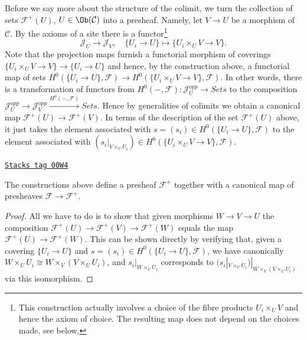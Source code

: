 \medskip\noindent
Before we say more about the structure of the colimit, we turn
the collection of sets
$\mathcal{F}^{+}(U)$, $U \in \Ob(\mathcal{C})$
into a presheaf. Namely, let $V \to U$ be a morphism of $\mathcal{C}$.
By the axioms of a site there is a functor\footnote{This construction
actually involves a choice of the fibre products $U_i \times_U V$
and hence the axiom of choice. The resulting map does not depend on
the choices made, see below.}
$$
\mathcal{J}_U
\longrightarrow
\mathcal{J}_V, \quad
\{U_i \to U\}
\longmapsto
\{U_i \times_U V \to V\}.
$$
Note that the projection maps furnish a functorial
morphism of coverings $\{U_i \times_U V \to V\} \to \{U_i \to U\}$
and hence, by the construction above, a functorial map of sets
$H^0(\{U_i \to U\}, \mathcal{F}) \to
H^0(\{U_i \times_U V \to V\}, \mathcal{F})$.
In other words, there is a transformation of functors
from $H^0(-, \mathcal{F}) : \mathcal{J}_U^{opp} \to \textit{Sets}$
to the composition
$\mathcal{J}_U^{opp} \to \mathcal{J}_V^{opp}
\xrightarrow{H^0(-, \mathcal{F})} \textit{Sets}$. Hence by
generalities of colimits we obtain a canonical map
$\mathcal{F}^+(U) \to \mathcal{F}^+(V)$. In terms of the description
of the set $\mathcal{F}^+(U)$ above, it just takes the element
associated with $s = (s_i) \in H^0(\{U_i \to U\}, \mathcal{F})$ to the
element associated with $(s_i|_{V \times_U U_i})
\in H^0(\{U_i \times_U V \to V\}, \mathcal{F})$.

\begin{lemma}
\label{sites-lemma-plus-presheaf}
\href{https://stacks.math.columbia.edu/tag/00W4}{\texttt{Stacks tag 00W4}}

The constructions above define a presheaf
$\mathcal{F}^+$ together with a canonical
map of presheaves $\mathcal{F} \to \mathcal{F}^+$.
\end{lemma}

\begin{proof}
All we have to do is to show that given morphisms
$W \to V \to U$ the composition $\mathcal{F}^+(U)
\to \mathcal{F}^+(V) \to \mathcal{F}^+(W)$
equals the map $\mathcal{F}^+(U) \to \mathcal{F}^+(W)$.
This can be shown directly by verifying that, given
a covering $\{U_i \to U\}$ and
$s = (s_i) \in H^0(\{U_i \to U\}, \mathcal{F})$,
we have canonically
$W \times_U U_i \cong W \times_V (V \times_U U_i)$,
and
$s_i|_{W \times_U U_i}$
corresponds to
$(s_i|_{V \times_U U_i})|_{W \times_V (V \times_U U_i)}$
via this isomorphism.
\end{proof}


